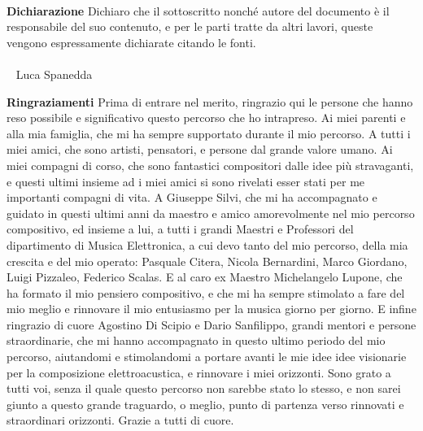 \documentclass[12pt]{article}
\begin{document}


\newpage
\
\newpage

\vfill
\LARGE \textbf{Dichiarazione} \normalsize \newline \newline
Dichiaro che il sottoscritto nonché autore del
documento è il responsabile del suo contenuto,
e per le parti tratte da altri lavori,
queste vengono espressamente dichiarate
citando le fonti. \\  \\
\
\hspace*{\fill} \large Luca Spanedda \normalsize
\
\newpage

\vfill
\LARGE \textbf{Ringraziamenti} \normalsize \newline \newline
Prima di entrare nel merito, ringrazio qui le persone
che hanno reso possibile e significativo questo percorso che ho intrapreso.
Ai miei parenti e alla mia famiglia, che mi ha sempre supportato durante il
mio percorso.
A tutti i miei amici, che sono artisti, pensatori, e persone dal grande valore umano.
Ai miei compagni di corso, che sono fantastici compositori dalle idee più stravaganti,
e questi ultimi insieme ad i miei amici si sono rivelati esser
stati per me importanti compagni di vita.
A Giuseppe Silvi, che mi ha accompagnato e guidato in questi ultimi anni da maestro
e amico amorevolmente nel mio percorso compositivo,
ed insieme a lui, a tutti i grandi Maestri e Professori del dipartimento di Musica Elettronica,
a cui devo tanto del mio percorso, della mia crescita e del mio operato:
Pasquale Citera, Nicola Bernardini, Marco Giordano, Luigi Pizzaleo, Federico Scalas.
E al caro ex Maestro Michelangelo Lupone, che ha formato il mio pensiero compositivo,
e che mi ha sempre stimolato a fare del mio meglio e rinnovare il mio entusiasmo
per la musica giorno per giorno.
E infine ringrazio di cuore Agostino Di Scipio e Dario Sanfilippo,
grandi mentori e persone straordinarie,
che mi hanno accompagnato in questo ultimo periodo del mio percorso,
aiutandomi e stimolandomi a portare avanti le
mie idee idee visionarie per la composizione elettroacustica,
e rinnovare i miei orizzonti.
Sono grato a tutti voi, senza il quale questo percorso non sarebbe stato lo stesso,
e non sarei giunto a questo grande traguardo,
o meglio, punto di partenza verso rinnovati e straordinari orizzonti.
Grazie a tutti di cuore.
\newpage
\
\newpage
\end{document}
